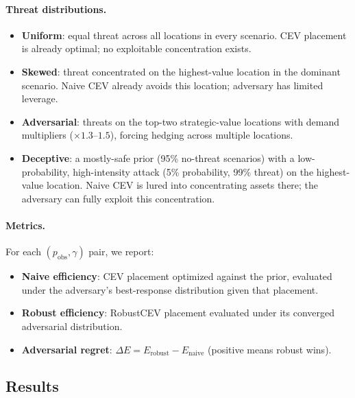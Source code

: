 \documentclass[11pt]{article}
\begin{document}
\paragraph{Threat distributions.}
\begin{itemize}
    \item \textbf{Uniform}: equal threat across all locations in every
          scenario.  CEV placement is already optimal; no exploitable
          concentration exists.
    \item \textbf{Skewed}: threat concentrated on the highest-value
          location in the dominant scenario.  Naive CEV already avoids
          this location; adversary has limited leverage.
    \item \textbf{Adversarial}: threats on the top-two strategic-value
          locations with demand multipliers ($\times 1.3$--$1.5$), forcing
          hedging across multiple locations.
    \item \textbf{Deceptive}: a mostly-safe prior (95\% no-threat scenarios)
          with a low-probability, high-intensity attack (5\% probability,
          99\% threat) on the highest-value location.  Naive CEV is lured
          into concentrating assets there; the adversary can fully exploit
          this concentration.
\end{itemize}

\paragraph{Metrics.}
For each $(p_\mathrm{obs}, \gamma)$ pair, we report:
\begin{itemize}
    \item \textbf{Naive efficiency}: CEV placement optimized against the
          prior, evaluated under the adversary's best-response distribution
          given that placement.
    \item \textbf{Robust efficiency}: RobustCEV placement evaluated under
          its converged adversarial distribution.
    \item \textbf{Adversarial regret}: $\Delta E = E_\mathrm{robust} -
          E_\mathrm{naive}$ (positive means robust wins).
\end{itemize}

\subsection{Results}
\label{sec:exp3:results}
\end{document}
